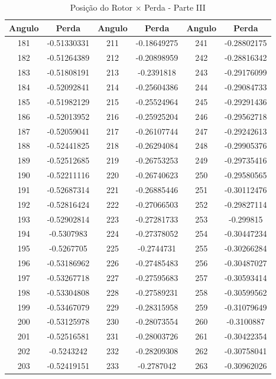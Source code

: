 \documentclass[
	12pt,				%
	openright,			%
	twoside,			%
	a4paper,			%
	english,			%
	french,				%
	spanish,			%
	brazil,				%
	]{abntex2}
\begin{document}
\begin{apendicesenv}
\newpage
\begin{table}[H]
\caption{Posição do Rotor $\times$  Perda - Parte III \label{tab:pr_iii}}
\centering
\begin{tabular}{c c| c c | c c}
Angulo & Perda & Angulo & Perda & Angulo & Perda \\
\hline
181 & -0.51330331 & 211 & -0.18649275 & 241 & -0.28802175\\
182 & -0.51264389 & 212 & -0.20898959 & 242 & -0.28816342\\
183 & -0.51808191 & 213 & -0.2391818 & 243 & -0.29176099\\
184 & -0.52092841 & 214 & -0.25604386 & 244 & -0.29084733\\
185 & -0.51982129 & 215 & -0.25524964 & 245 & -0.29291436\\
186 & -0.52013952 & 216 & -0.25925204 & 246 & -0.29562718\\
187 & -0.52059041 & 217 & -0.26107744 & 247 & -0.29242613\\
188 & -0.52441825 & 218 & -0.26294084 & 248 & -0.29905376\\
189 & -0.52512685 & 219 & -0.26753253 & 249 & -0.29735416\\
190 & -0.52211116 & 220 & -0.26740623 & 250 & -0.29580565\\
191 & -0.52687314 & 221 & -0.26885446 & 251 & -0.30112476\\
192 & -0.52816424 & 222 & -0.27066503 & 252 & -0.29827114\\
193 & -0.52902814 & 223 & -0.27281733 & 253 & -0.299815\\
194 & -0.5307983 & 224 & -0.27378052 & 254 & -0.30447234\\
195 & -0.5267705 & 225 & -0.2744731 & 255 & -0.30266284\\
196 & -0.53186962 & 226 & -0.27485483 & 256 & -0.30487027\\
197 & -0.53267718 & 227 & -0.27595683 & 257 & -0.30593414\\
198 & -0.53304808 & 228 & -0.27589231 & 258 & -0.30599562\\
199 & -0.53467079 & 229 & -0.28315958 & 259 & -0.31079649\\
200 & -0.53125978 & 230 & -0.28073554 & 260 & -0.3100887\\
201 & -0.52516581 & 231 & -0.28003726 & 261 & -0.30422354\\
202 & -0.5243242 & 232 & -0.28209308 & 262 & -0.30758041\\
203 & -0.52419151 & 233 & -0.2787042 & 263 & -0.30962026\\

\end{tabular}
\end{table}
\end{apendicesenv}
\end{document}
